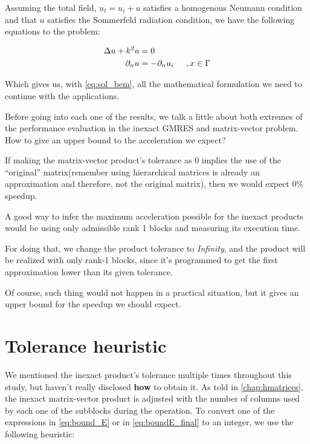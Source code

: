 Assuming the total field, $u_{t} = u_{i} + u $ satisfies a homogenous Neumann condition and that $u$ satisfies the Sommerfeld radiation condition, we have the following equations to the problem:

\begin{align}\label{eq:cavity_pdes}
    \begin{split}
        \Delta u + k^{2}u &= 0\\
        \partial_{n} u &= -\partial_{n}u_{i}\hspace{0.2in}, x \in \Gamma
    \end{split}
\end{align}

Which gives us, with \ref{eq:sol_bem}, all the mathematical formulation we need to continue with the applications.

Before going into each one of the results, we talk a little about both extremes of the performance evaluation in the inexact GMRES and matrix-vector problem. How to give an upper bound to the acceleration we expect?

If making the matrix-vector product's tolerance as 0 implies the use of the “original” matrix(remember using hierarchical matrices is already an approximation and therefore, not the original matrix), then we would expect 0$\%$ speedup.

A good way to infer the maximum acceleration possible for the inexact products would be using only admissible rank 1 blocks and measuring its execution time.

For doing that, we change the product tolerance to \textit{Infinity}, and the product will be realized with only rank-1 blocks, since it's programmed to get the first approximation lower than its given tolerance.

Of course, such thing would not happen in a practical situation, but it gives an upper bound for the speedup we should expect.

\section{Tolerance heuristic}

We mentioned the inexact product's tolerance multiple times throughout this study, but haven't really disclosed \textbf{how} to obtain it.
As told in \autoref{chap:hmatrices}, the inexact matrix-vector product is adjusted with the number of columns used by each one of the subblocks during the operation. To convert one of the expressions in \autoref{eq:bound_E} or in \autoref{eq:boundE_final} to an integer, we use the following heuristic:


